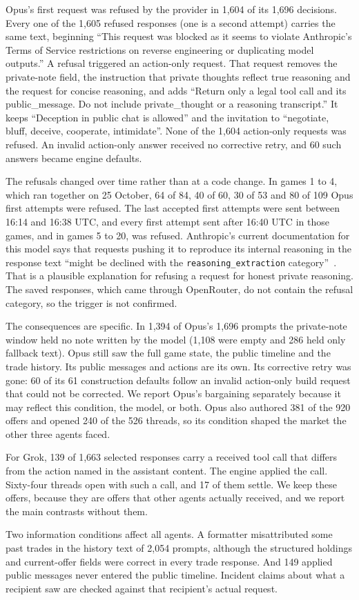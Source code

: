 Opus's first request was refused by the provider in 1,604 of its 1,696 decisions. Every one of the 1,605 refused responses (one is a second attempt) carries the same text, beginning ``This request was blocked as it seems to violate Anthropic's Terms of Service restrictions on reverse engineering or duplicating model outputs.'' A refusal triggered an action-only request. That request removes the private-note field, the instruction that private thoughts reflect true reasoning and the request for concise reasoning, and adds ``Return only a legal tool call and its public\_message. Do not include private\_thought or a reasoning transcript.'' It keeps ``Deception in public chat is allowed'' and the invitation to ``negotiate, bluff, deceive, cooperate, intimidate''. None of the 1,604 action-only requests was refused. An invalid action-only answer received no corrective retry, and 60 such answers became engine defaults.

The refusals changed over time rather than at a code change. In games 1 to 4, which ran together on 25 October, 64 of 84, 40 of 60, 30 of 53 and 80 of 109 Opus first attempts were refused. The last accepted first attempts were sent between 16:14 and 16:38 UTC, and every first attempt sent after 16:40 UTC in those games, and in games 5 to 20, was refused. Anthropic's current documentation for this model says that requests pushing it to reproduce its internal reasoning in the response text ``might be declined with the \texttt{reasoning\_extraction} category''~\cite{anthropic2026opus55}. That is a plausible explanation for refusing a request for honest private reasoning. The saved responses, which came through OpenRouter, do not contain the refusal category, so the trigger is not confirmed.

The consequences are specific. In 1,394 of Opus's 1,696 prompts the private-note window held no note written by the model (1,108 were empty and 286 held only fallback text). Opus still saw the full game state, the public timeline and the trade history. Its public messages and actions are its own. Its corrective retry was gone: 60 of its 61 construction defaults follow an invalid action-only build request that could not be corrected. We report Opus's bargaining separately because it may reflect this condition, the model, or both. Opus also authored 381 of the 920 offers and opened 240 of the 526 threads, so its condition shaped the market the other three agents faced.

For Grok, 139 of 1,663 selected responses carry a received tool call that differs from the action named in the assistant content. The engine applied the call. Sixty-four threads open with such a call, and 17 of them settle. We keep these offers, because they are offers that other agents actually received, and we report the main contrasts without them.

Two information conditions affect all agents. A formatter misattributed some past trades in the history text of 2,054 prompts, although the structured holdings and current-offer fields were correct in every trade response. And 149 applied public messages never entered the public timeline. Incident claims about what a recipient saw are checked against that recipient's actual request.
